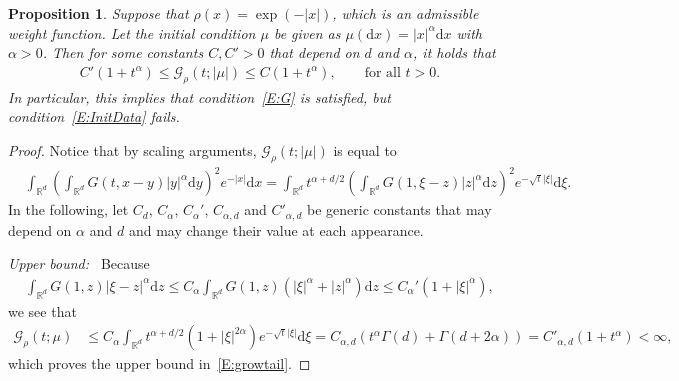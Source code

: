 \documentclass[a4paper,11pt]{article}%
\theoremstyle{plain}
\newtheorem{proposition}[theorem]{Proposition}
\theoremstyle{definition}
\numberwithin{equation}{section}
\newcommand{\R}{\mathbb{R}}
\newcommand{\ud}{\ensuremath{\mathrm{d}}}
\begin{document}
\begin{proposition}\label{P:growtail}
  Suppose that $\rho(x) = \exp(-|x|)$, which is an admissible weight function. Let the initial
  condition $\mu$ be given as $\mu(\ud x) = |x|^\alpha \ud x$ with $\alpha>0$. Then for some
  constants $C, C'>0$ that depend on $d$ and $\alpha$, it holds that
  \begin{align}\label{E:growtail}
    C' (1+t^\alpha) \le \mathcal{G}_\rho(t;|\mu|) \le C (1+t^\alpha), \qquad \text{for all $t>0$}.
  \end{align}
  In particular, this implies that condition~\eqref{E:G} is satisfied, but condition~\eqref{E:InitData} fails.
\end{proposition}
\begin{proof}
  Notice that by scaling arguments, $\mathcal{G}_\rho(t;|\mu|)$ is equal to
  \begin{align*}
    &   \int_{\R^d} \left(\int_{\R^d}G(t,x-y) |y|^\alpha \ud y\right)^2 e^{-|x|} \ud x
      = \int_{\R^d}t^{\alpha+d/2} \left(\int_{\R^d}G\left(1,\xi-z\right) |z|^\alpha \ud z\right)^2 e^{-\sqrt{t}|\xi|} \ud \xi.
  \end{align*}
  In the following, let $C_d$, $C_\alpha$, $C_\alpha'$, $C_{\alpha, d}$ and $C'_{\alpha, d}$ be
  generic constants that may depend on $\alpha $ and $d$ and may change their value at each
  appearance. \medskip

  \noindent\textit{Upper bound:~} Because
  \begin{align*}
    \int_{\R^d}G\left(1,z\right) |\xi-z|^\alpha \ud z
    \le C_\alpha \int_{\R^d}G\left(1,z\right) \left(|\xi|^\alpha + |z|^\alpha\right) \ud z
    \le C_\alpha' \left(1+|\xi|^\alpha\right),
  \end{align*}
  we see that
  \begin{align*}
    \mathcal{G}_\rho(t;\mu)
    & \le C_\alpha \int_{\R^d}t^{\alpha+d/2} \left(1+|\xi|^{2\alpha}\right) e^{-\sqrt{t}|\xi|} \ud \xi
      = C_{\alpha, d} \left(t^\alpha \Gamma(d) + \Gamma(d+2\alpha)\right)
      = C'_{\alpha, d} (1+ t^\alpha)<\infty,
  \end{align*}
  which proves the upper bound in~\eqref{E:growtail}. \medskip


\end{proof}
\end{document}
